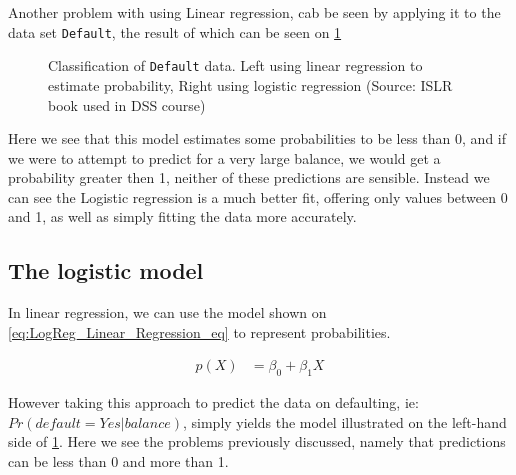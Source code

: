 Another problem with using Linear regression, cab be seen by applying it to the data set \texttt{Default}, the result of which can be seen on \cref{fig:LinReg_vs_LogReg}

\begin{figure}[H]
	\centering
	\caption{Classification of \texttt{Default} data. Left using linear regression to estimate probability, Right using logistic regression (Source: ISLR book\cite{book_2015} used in DSS course)}
	\label{fig:LinReg_vs_LogReg}
\end{figure}

Here we see that this model estimates some probabilities to be less than 0, and if we were to attempt to predict for a very large balance, we would get a probability greater then 1, neither of these predictions are sensible. Instead we can see the Logistic regression is a much better fit, offering only values between 0 and 1, as well as simply fitting the data more accurately.

\subsection{The logistic model}

In linear regression, we can use the model shown on \cref{eq:LogReg_Linear_Regression_eq} to represent probabilities.

\begin{equation} \label{eq:LogReg_Linear_Regression_eq}
\begin{split}
p(X) & = \beta_0 + \beta_1 X
\end{split}
\end{equation} 

However taking this approach to predict the data on defaulting, ie: $Pr(default=Yes|balance)$, simply yields the model illustrated on the left-hand side of \cref{fig:LinReg_vs_LogReg}. Here we see the problems previously discussed, namely that predictions can be less than 0 and more than 1.

